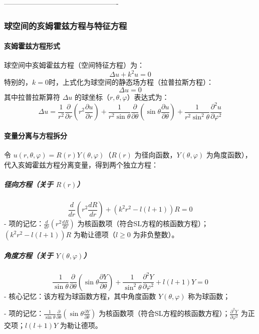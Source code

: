 \documentclass{article}
\begin{document}
	
	
	

\iffalse		

-------------------------------------------------
			
				\subsubsection{球空间的亥姆霍兹方程与特征方程}
			
			\paragraph{亥姆霍兹方程形式}
			球空间中亥姆霍兹方程（空间特征方程）为：
			\[
			\Delta u + k^2 u = 0
			\]
				特别的，$k = 0$时，上式化为球空间的静态场方程（拉普拉斯方程）：
				\[
				\Delta u = 0
				\]
				其中拉普拉斯算符 \( \Delta u \) 的球坐标（\( r, \theta, \varphi \)）表达式为：
				\[
				\Delta u = \frac{1}{r^2} \frac{\partial}{\partial r} \left( r^2 \frac{\partial u}{\partial r} \right) + \frac{1}{r^2 \sin\theta} \frac{\partial}{\partial \theta} \left( \sin\theta \frac{\partial u}{\partial \theta} \right) + \frac{1}{r^2 \sin^2\theta} \frac{\partial^2 u}{\partial \varphi^2}
				\]
				
				\paragraph{变量分离与方程拆分}
				令 \( u(r, \theta, \varphi) = R(r) Y(\theta, \varphi) \)（\( R(r) \) 为径向函数，\( Y(\theta, \varphi) \) 为角度函数），代入亥姆霍兹方程分离变量，得到两个独立方程：
				
				\subparagraph{径向方程（关于 \( R(r) \)）}
				\[
				\frac{d}{dr} \left( r^2 \frac{dR}{dr} \right) + \left( k^2 r^2 - l(l + 1) \right) R = 0
				\]
				- 项的记忆：\( \frac{d}{dr} \left( r^2 \frac{dR}{dr} \right) \) 为核函数项（符合SL方程的核函数方程）；\( \left( k^2 r^2 - l(l + 1) \right) R \) 为勒让德项（\( l \geq 0 \) 为非负整数）。
				
				\subparagraph{角度方程（关于 \( Y(\theta, \varphi) \)）}
				\[
				\frac{1}{\sin\theta} \frac{\partial}{\partial \theta} \left( \sin\theta \frac{\partial Y}{\partial \theta} \right) + \frac{1}{\sin^2\theta} \frac{\partial^2 Y}{\partial \varphi^2} + l(l + 1) Y = 0
				\]
				- 核心记忆：该方程为球函数方程，其中角度函数 \( Y(\theta, \varphi) \) 称为球函数；
				
				- 项的记忆：\( \frac{1}{\sin\theta} \frac{\partial}{\partial \theta} \left( \sin\theta \frac{\partial Y}{\partial \theta} \right) \) 为核函数项（符合SL方程的核函数方程）；\( \frac{\partial^2 Y}{\partial \varphi^2} \) 为正交项；\( l(l + 1) Y \) 为勒让德项。
				
\end{document}
